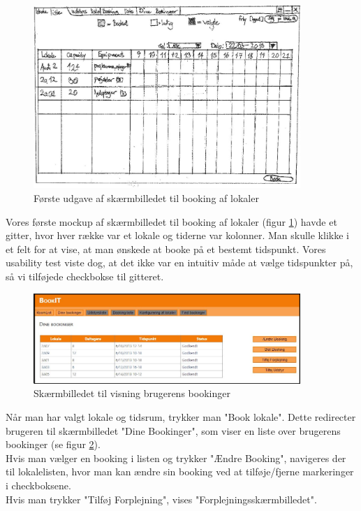 \begin{figure}[h!]
  \centering
    \includegraphics[width=0.9\textwidth]{Appendix/GUI-Prototype/PaperMockup/LokaleListe_001}
  \caption{Første udgave af skærmbilledet til booking af lokaler}
\label{Design_G_Development_FirstGrid}
\end{figure}

Vores første mockup af skærmbilledet til booking af lokaler (figur \ref{Design_G_Development_FirstGrid}) havde et gitter, hvor hver række var et lokale og tiderne var kolonner. Man skulle klikke i et felt for at vise, at man ønskede at booke på et bestemt tidspunkt. Vores usability test viste dog, at det ikke var en intuitiv måde at vælge tidspunkter på, så vi tilføjede checkbokse til gitteret.

\begin{figure}[h!]
  \centering
    \includegraphics[width=0.9\textwidth]{Appendix/GUI-Prototype/DigitalMockup/DineBookinger}
  \caption{Skærmbilledet til visning brugerens bookinger}
\label{Design_G_Development_YourBookings_Final}
\end{figure} 

Når man har valgt lokale og tidsrum, trykker man "Book lokale". Dette redirecter brugeren til skærmbilledet "Dine Bookinger", som viser en liste over brugerens bookinger (se figur \ref{Design_G_Development_YourBookings_Final}). 
\\Hvis man vælger en booking i listen og trykker "Ændre Booking", navigeres der til lokalelisten, hvor man kan ændre sin booking ved at tilføje/fjerne markeringer i checkboksene. 
\\Hvis man trykker "Tilføj Forplejning", vises "Forplejningsskærmbilledet".


